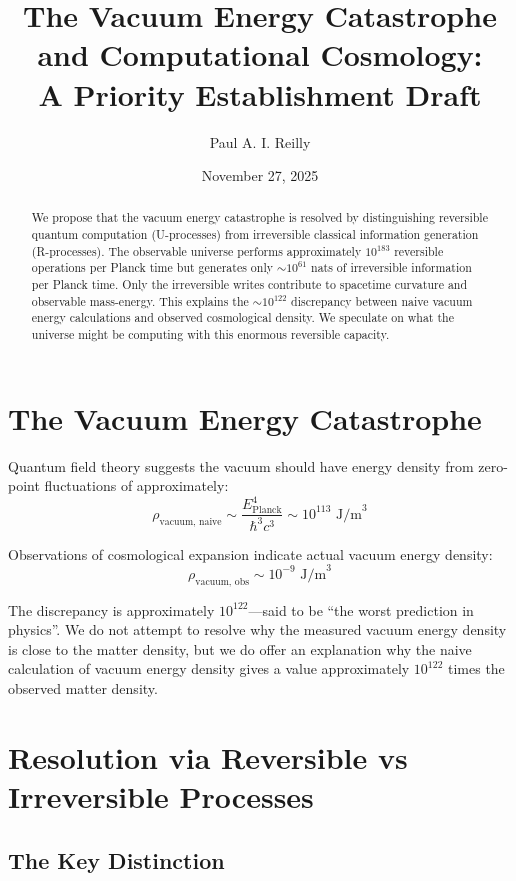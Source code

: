 ﻿\documentclass{article}
\title{The Vacuum Energy Catastrophe and Computational Cosmology: \\
A Priority Establishment Draft}
\author{Paul A. I. Reilly}
\date{November 27, 2025}
\begin{document}
\maketitle


\begin{abstract}
We propose that the vacuum energy catastrophe is resolved by distinguishing reversible quantum computation (U-processes) from irreversible classical information generation (R-processes). The observable universe performs approximately $10^{183}$ reversible operations per Planck time but generates only $\sim 10^{61}$ nats of irreversible information per Planck time. Only the irreversible writes contribute to spacetime curvature and observable mass-energy. This explains the $\sim 10^{122}$ discrepancy between naive vacuum energy calculations and observed cosmological density. We speculate on what the universe might be computing with this enormous reversible capacity.
\end{abstract}


\section{The Vacuum Energy Catastrophe}


Quantum field theory suggests the vacuum should have energy density from zero-point fluctuations of approximately:
\begin{equation}
\rho_{\text{vacuum, naive}} \sim \frac{E_{\text{Planck}}^4}{\hbar^3 c^3} \sim 10^{113} \text{ J/m}^3
\end{equation}


Observations of cosmological expansion indicate actual vacuum energy density:
\begin{equation}
\rho_{\text{vacuum, obs}} \sim 10^{-9} \text{ J/m}^3
\end{equation}


The discrepancy is approximately $10^{122}$—said to be “the worst prediction in physics”.
We do not attempt to resolve why the measured vacuum energy density is close to the matter density, but we do offer an explanation why the naive calculation of vacuum energy density gives a value approximately $10^122$ times the observed matter density.


\section{Resolution via Reversible vs Irreversible Processes}


\subsection{The Key Distinction}
\end{document}
